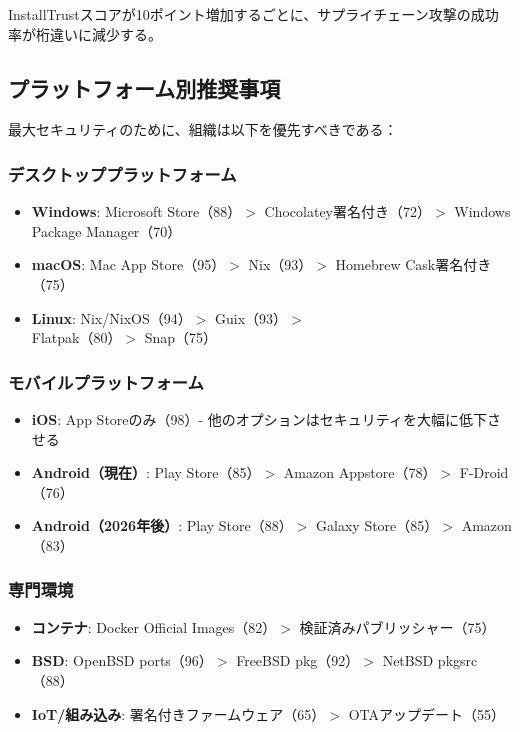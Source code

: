 \documentclass[Specialissue]{jsaiart}
\begin{document}
InstallTrustスコアが10ポイント増加するごとに、サプライチェーン攻撃の成功率が桁違いに減少する。

\subsection{プラットフォーム別推奨事項}

最大セキュリティのために、組織は以下を優先すべきである：

\subsubsection{デスクトッププラットフォーム}

\begin{itemize}
    \item \textbf{Windows}: Microsoft Store（88）$>$ Chocolatey署名付き（72）$>$ Windows Package Manager（70）
    \item \textbf{macOS}: Mac App Store（95）$>$ Nix（93）$>$ Homebrew Cask署名付き（75）
    \item \textbf{Linux}: Nix/NixOS（94）$>$ Guix（93）$>$\\Flatpak（80）$>$ Snap（75）
\end{itemize}

\subsubsection{モバイルプラットフォーム}

\begin{itemize}
    \item \textbf{iOS}: App Storeのみ（98）- 他のオプションはセキュリティを大幅に低下させる
    \item \textbf{Android（現在）}: Play Store（85）$>$ Amazon Appstore（78）$>$ F-Droid（76）
    \item \textbf{Android（2026年後）}: Play Store（88）$>$ Galaxy Store（85）$>$ Amazon（83）
\end{itemize}

\subsubsection{専門環境}

\begin{itemize}
    \item \textbf{コンテナ}: Docker Official Images（82）$>$ 検証済みパブリッシャー（75）
    \item \textbf{BSD}: OpenBSD ports（96）$>$ FreeBSD pkg（92）$>$ NetBSD pkgsrc（88）
    \item \textbf{IoT/組み込み}: 署名付きファームウェア（65）$>$ OTAアップデート（55）
\end{itemize}
\end{document}
